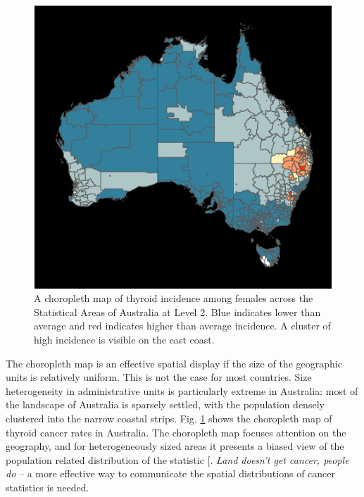 \documentclass[
]{article}
\begin{document}
\begin{figure}

{\centering \includegraphics[width=1\linewidth,height=0.3\textheight]{paper_files/figure-latex/thyroid-choro-1} 

}

\caption{A choropleth map of thyroid incidence among females across the Statistical Areas of Australia at Level 2. Blue indicates lower than average and red indicates higher than average incidence. A cluster of high incidence is visible on the east coast.}\label{fig:thyroid-choro}
\end{figure}

The choropleth map is an effective spatial display if the size of the
geographic units is relatively uniform. This is not the case for most
countries. Size heterogeneity in administrative units is particularly
extreme in Australia: most of the landscape of Australia is sparsely
settled, with the population densely clustered into the narrow coastal
strips. Fig. \ref{fig:thyroid-choro} shows the choropleth map of thyroid
cancer rates in Australia. The choropleth map focuses attention on the
geography, and for heterogeneously sized areas it presents a biased view
of the population related distribution of the statistic
{[}\citeproc{ref-CBATCC}{6}{]}. \emph{Land doesn't get cancer, people
do} -- a more effective way to communicate the spatial distributions of
cancer statistics is needed.
\end{document}
